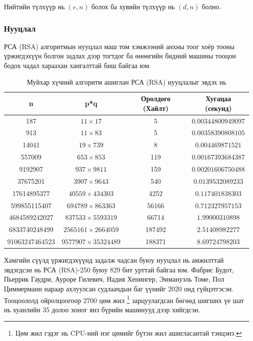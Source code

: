 	Нийтийн түлхүүр нь $(e, n)$ болох ба хувийн түлхүүр нь $(d, n)$ болно.\cite{РСА (RSA)}
	
\subsubsection{Нууцлал}
РСА (RSA) алгоритмын нууцлал маш том хэмжээний анхны тоог хоёр тооны үржигдэхүүн болгон задлах дээр тогтдог ба өнөөгийн бидний машины тооцон бодох чадал хараахан хангалттай биш байгаа юм.

\begin{table}[h!]
	\centering
	\caption{Муйхар хүчний алгоритм ашиглан РСА (RSA) нууцлалыг эвдэх нь \cite{Brute-force-РСА (RSA)}}
	\begin{tabular}{|c|c|c|c|}
	\hline
	n & p*q & Оролдого (Хайлт) & Хугацаа (секунд) \\
	\hline
	187 & $11 \times 17$ & 5 & $0.00344800949097$ \\
	913 & $11 \times 83$ & 5 & $0.00358390808105$ \\
	14041 & $19 \times 739$ & 8 & $0.004469871521$ \\
	557009 & $653 \times 853$ & 119 & $0.00167393684387$ \\
	9192907 & $937 \times 9811$ & 159 & $0.00201606750488$ \\
	37675201 & $3907 \times 9643$ & 540 & $0.0139532089233$ \\
	17614895377 & $40559 \times 434303$ & 4252 & $0.117401838303$ \\
	599855115407 & $694789 \times 863363$ & 56166 & $0.712327957153$ \\
	4684589242027 & $837533 \times 5593319$ & 66714 & $1.99000310898$ \\
	6833740248499 & $2565161 \times 2664059$ & 187492 & $2.51408982277$ \\
	91063247464523 & $9577907 \times 35324489$ & 188371 & $8.69724798203$ \\
	\hline
	\end{tabular}
	\end{table}

	Хамгийн сүүлд үржигдэхүүнд задалж чадсан буюу нууцлал нь амжилттай эвдэгдсэн нь РСА (RSA)-250 буюу 829 бит урттай байгаа юм. Фабрис Будот, Пьеррик Гаудри, Ауроре Гилевич, Надия Хенингер, Эммануэль Томе, Пол Циммерманн нараар ахлуулсан судлаачдын баг үүнийг 2020 онд гүйцэтгэсэн. Тооцоололд ойролцоогоор 2700 цөм жил \footnote{Цөм жил гэдэг нь CPU-ний нэг цөмийг бүтэн жил ашигласантай тэнцэнэ.} зарцуулагдсан бөгөөд шигших үе шат нь хуанлийн 35 долоо хоног янз бүрийн машинууд дээр хийгдсэн.

